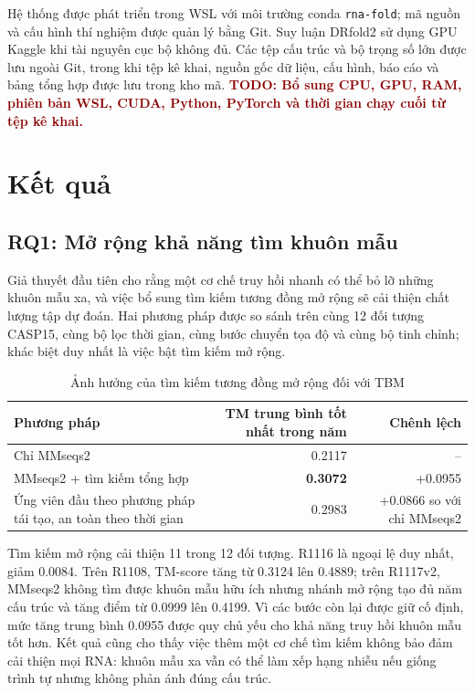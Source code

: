 \documentclass[12pt,a4paper,oneside]{report}
\newcommand{\TODO}[1]{\textcolor{darkred}{\textbf{TODO: #1}}}
\begin{document}
Hệ thống được phát triển trong WSL với môi trường conda \texttt{rna-fold}; mã nguồn và
cấu hình thí nghiệm được quản lý bằng Git. Suy luận DRfold2 sử dụng GPU Kaggle khi tài
nguyên cục bộ không đủ. Các tệp cấu trúc và bộ trọng số lớn được lưu ngoài Git, trong
khi tệp kê khai, nguồn gốc dữ liệu, cấu hình, báo cáo và bảng tổng hợp được lưu trong
kho mã. \TODO{Bổ sung CPU, GPU, RAM, phiên bản WSL, CUDA, Python, PyTorch và thời gian
chạy cuối từ tệp kê khai.}

\chapter{Kết quả}

\section{RQ1: Mở rộng khả năng tìm khuôn mẫu}

Giả thuyết đầu tiên cho rằng một cơ chế truy hồi nhanh có thể bỏ lỡ những khuôn mẫu xa,
và việc bổ sung tìm kiếm tương đồng mở rộng sẽ cải thiện chất lượng tập dự đoán. Hai
phương pháp được so sánh trên cùng 12 đối tượng CASP15, cùng bộ lọc thời gian, cùng bước
chuyển tọa độ và cùng bộ tinh chỉnh; khác biệt duy nhất là việc bật tìm kiếm mở rộng.

\begin{table}[H]
\centering
\caption{Ảnh hưởng của tìm kiếm tương đồng mở rộng đối với TBM}
\begin{tabularx}{\textwidth}{Xrr}
\toprule
Phương pháp & TM trung bình tốt nhất trong năm & Chênh lệch\\
\midrule
Chỉ MMseqs2 & 0.2117 & --\\
MMseqs2 + tìm kiếm tổng hợp & \textbf{0.3072} & +0.0955\\
Ứng viên đầu theo phương pháp tái tạo, an toàn theo thời gian & 0.2983 & +0.0866 so với chỉ MMseqs2\\
\bottomrule
\end{tabularx}
\end{table}

Tìm kiếm mở rộng cải thiện 11 trong 12 đối tượng. R1116 là ngoại lệ duy nhất, giảm
0.0084. Trên R1108, TM-score tăng từ 0.3124 lên 0.4889; trên R1117v2, MMseqs2 không
tìm được khuôn mẫu hữu ích nhưng nhánh mở rộng tạo đủ năm cấu trúc và tăng điểm từ
0.0999 lên 0.4199. Vì các bước còn lại được giữ cố định, mức tăng trung bình 0.0955
được quy chủ yếu cho khả năng truy hồi khuôn mẫu tốt hơn. Kết quả cũng cho thấy việc
thêm một cơ chế tìm kiếm không bảo đảm cải thiện mọi RNA: khuôn mẫu xa vẫn có thể làm
xếp hạng nhiễu nếu giống trình tự nhưng không phản ánh đúng cấu trúc.
\end{document}
